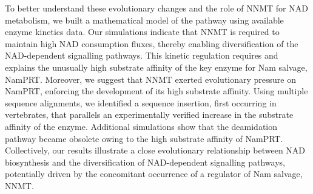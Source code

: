 To better understand these evolutionary changes and the role of NNMT for NAD metabolism, we built a mathematical model of the pathway using available enzyme kinetics data. Our simulations indicate that NNMT is required to maintain high NAD consumption fluxes, thereby enabling diversification of the NAD-dependent signalling pathways. This kinetic regulation requires and explains the unusually high substrate affinity of the key enzyme for Nam salvage, NamPRT. Moreover, we suggest that NNMT exerted evolutionary pressure on NamPRT, enforcing the development of its high substrate affinity. Using multiple sequence alignments, we identified a sequence insertion, first occurring in vertebrates, that parallels an experimentally verified increase in the substrate affinity of the enzyme. Additional simulations show that the deamidation pathway became obsolete owing to the high substrate affinity of NamPRT. Collectively, our results illustrate a close evolutionary relationship between NAD biosynthesis and the diversification of NAD-dependent signalling pathways, potentially driven by the concomitant occurrence of a regulator of Nam salvage, NNMT.


